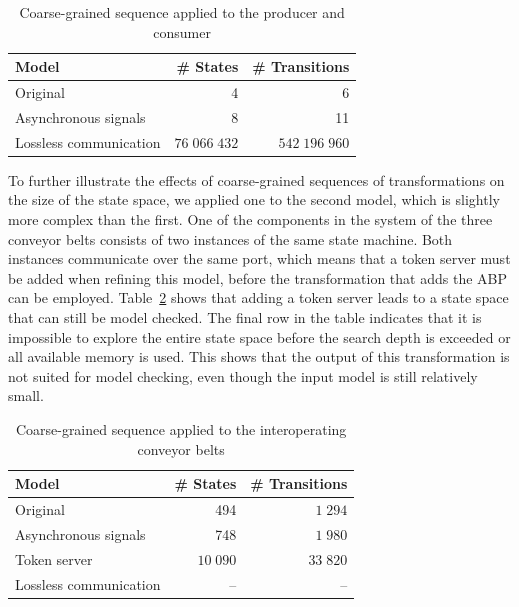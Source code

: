 \begin{table}[hbt]
\centering
\small
\begin{tabular}{|l|r|r|}
\hline
\rowcolor[gray]{.9}
\textbf{Model}          & \textbf{\# States}      & \textbf{\# Transitions} \\
\hline
 Original               & 4              & 6 \\
\hline
 Asynchronous signals   & 8              & 11 \\
\hline
 Lossless communication & $76\;066\;432$ & $542\;196\;960$ \\
\hline
\end{tabular}
\caption{Coarse-grained sequence applied to the producer and consumer}
\label{tab:simple_coarse_grained}
\end{table}

To further illustrate the effects of coarse-grained sequences of transformations on the size of the state space, we applied one to the second model, which is slightly more complex than the first.
One of the components in the system of the three conveyor belts consists of two instances of the same state machine.
Both instances communicate over the same port, which means that a token server must be added when refining this model, before the transformation that adds the ABP can be employed.
Table~\ref{tab:legocase_coarse_grained} shows that adding a token server leads to a state space that can still be model checked.
The final row in the table indicates that it is impossible to explore the entire state space before the search depth is exceeded or all available memory is used.
This shows that the output of this transformation is not suited for model checking, even though the input model is still relatively small.

\begin{table}[hbt]
\centering
\small
\begin{tabular}{|l|r|r|}
\hline
\rowcolor[gray]{.9}
 \textbf{Model}         & \textbf{\# States} & \textbf{\# Transitions} \\
\hline
 Original               & 494                & $1\;294$ \\
\hline
 Asynchronous signals   & 748                & $1\;980$ \\
\hline
 Token server           & $10\;090$          & $33\;820$ \\
\hline
 Lossless communication & --                 & -- \\
 \hline
\end{tabular}
\caption{Coarse-grained sequence applied to the interoperating conveyor belts}
\label{tab:legocase_coarse_grained}
\end{table}

